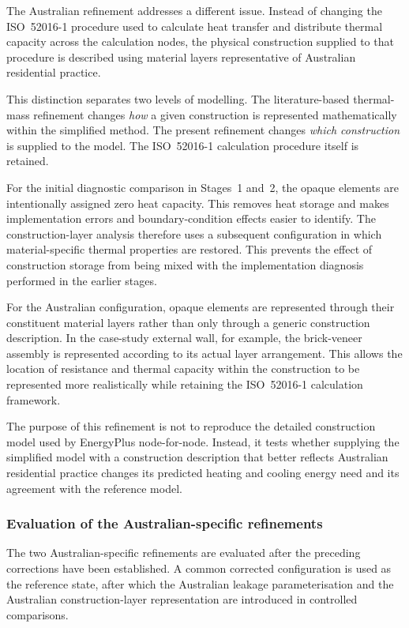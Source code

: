 \documentclass[12pt, a4paper]{article}
\begin{document}
The Australian refinement addresses a different issue. Instead of changing
the ISO~52016-1 procedure used to calculate heat transfer and distribute
thermal capacity across the calculation nodes, the physical construction
supplied to that procedure is described using material layers representative
of Australian residential practice.

This distinction separates two levels of modelling. The literature-based
thermal-mass refinement changes \emph{how} a given construction is represented
mathematically within the simplified method. The present refinement changes
\emph{which construction} is supplied to the model. The ISO~52016-1 calculation
procedure itself is retained.

For the initial diagnostic comparison in Stages~1 and~2, the opaque elements
are intentionally assigned zero heat capacity. This removes heat storage and
makes implementation errors and boundary-condition effects easier to identify.
The construction-layer analysis therefore uses a subsequent configuration in
which material-specific thermal properties are restored. This prevents the
effect of construction storage from being mixed with the implementation
diagnosis performed in the earlier stages.

For the Australian configuration, opaque elements are represented through
their constituent material layers rather than only through a generic
construction description. In the case-study external wall, for example, the
brick-veneer assembly is represented according to its actual layer arrangement.
This allows the location of resistance and thermal capacity within the
construction to be represented more realistically while retaining the
ISO~52016-1 calculation framework.

The purpose of this refinement is not to reproduce the detailed construction
model used by EnergyPlus node-for-node. Instead, it tests whether supplying
the simplified model with a construction description that better reflects
Australian residential practice changes its predicted heating and cooling
energy need and its agreement with the reference model.

\subsubsection{Evaluation of the Australian-specific refinements}

The two Australian-specific refinements are evaluated after the preceding
corrections have been established. A common corrected configuration is used
as the reference state, after which the Australian leakage parameterisation
and the Australian construction-layer representation are introduced in
controlled comparisons.
\end{document}

